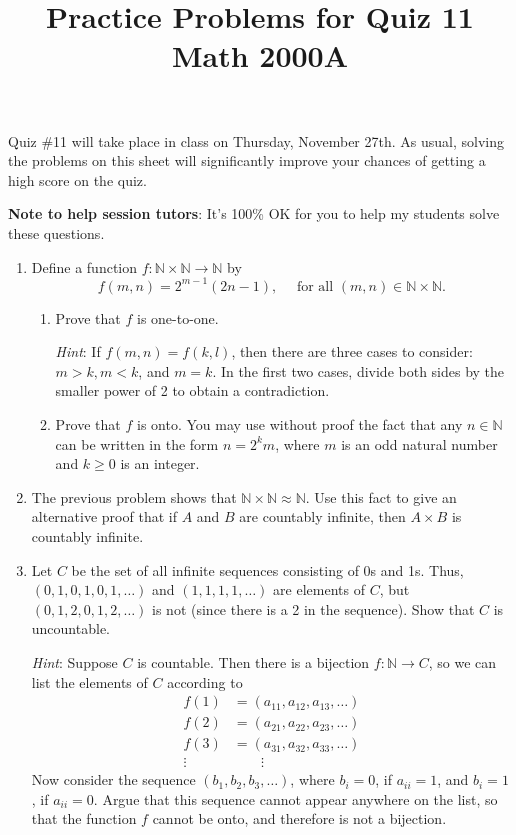 \documentclass[letterpaper,12pt]{article}
\title{Practice Problems for Quiz 11\\Math 2000A}
\date{}
\newcommand{\N}{\mathbb{N}}
\begin{document}
 \maketitle
\vspace{-0.5in}

Quiz \#11 will take place in class on Thursday, November 27th. 
As usual, solving the problems on this sheet will significantly improve your chances of getting a high score on the quiz.

{\bf Note to help session tutors}: It's 100\% OK for you to help my students solve these questions.
\begin{enumerate}
\item Define a function $f:\N\times\N\to\N$ by
\[
f(m,n)=2^{m-1}(2n-1), \quad \text{ for all } (m,n)\in\N\times\N.                                            
\]
\begin{enumerate}
 \item Prove that $f$ is one-to-one.

{\em Hint}: If $f(m,n) = f(k,l)$, then there are three cases to consider: $m>k, m<k$, and $m=k$. In the first two cases, divide both sides by the smaller power of 2 to obtain a contradiction.
 \item Prove that $f$ is onto. You may use without proof the fact that any $n\in\N$ can be written in the form $n=2^km$, where $m$ is an odd natural number and $k\geq 0$ is an integer.
\end{enumerate}
\item The previous problem shows that $\N\times\N\approx\N$. Use this fact to give an alternative proof that if $A$ and $B$ are countably infinite, then $A\times B$ is countably infinite.
\item Let $C$ be the set of all infinite sequences consisting of 0s and 1s. Thus, $(0,1,0,1,0,1,\ldots)$ and $(1,1,1,1,\ldots)$ are elements of $C$, but $(0,1,2,0,1,2,\ldots)$ is not (since there is a 2 in the sequence). Show that $C$ is uncountable.

{\em Hint}: Suppose $C$ is countable. Then there is a bijection $f:\N\to C$, so we can list the elements of $C$ according to
\begin{align*}
 f(1)& = (a_{11},a_{12},a_{13},\ldots)\\
 f(2)& = (a_{21},a_{22},a_{23},\ldots)\\
 f(3)& = (a_{31},a_{32},a_{33},\ldots)\\
 \vdots & \quad \quad \vdots
\end{align*}
Now consider the sequence $(b_1,b_2,b_3,\ldots)$, where $b_i = 0$, if $a_{ii}=1$, and $b_i=1$, if $a_{ii}=0$. Argue that this sequence cannot appear anywhere on the list, so that the function $f$ cannot be onto, and therefore is not a bijection.


\end{enumerate}
\end{document}
